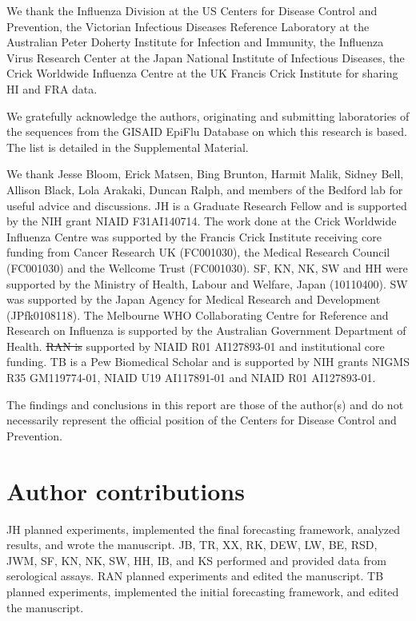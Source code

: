 \documentclass[9pt,lineno]{elife} %
\providecommand{\DIFadd}[1]{{\protect\color{blue}\uwave{#1}}} %
\providecommand{\DIFdel}[1]{{\protect\color{red}\sout{#1}}}                      %
\providecommand{\DIFaddbegin}{} %
\providecommand{\DIFaddend}{} %
\providecommand{\DIFdelbegin}{} %
\providecommand{\DIFdelend}{} %
\providecommand{\DIFaddtex}[1]{{\protect\color{blue}\uwave{#1}}} %
\providecommand{\DIFdeltex}[1]{{\protect\color{red}\sout{#1}}}                      %
\providecommand{\DIFaddbegin}{} %
\providecommand{\DIFaddend}{} %
\providecommand{\DIFdelbegin}{} %
\providecommand{\DIFdelend}{} %
\providecommand{\DIFadd}[1]{\texorpdfstring{\DIFaddtex{#1}}{#1}} %
\providecommand{\DIFdel}[1]{\texorpdfstring{\DIFdeltex{#1}}{}} %
\newcommand{\DIFscaledelfig}{0.5}
\newlength{\DIFdelgraphicswidth} %
\newlength{\DIFdelgraphicsheight} %
\newcommand{\DIFaddincludegraphics}[2][]{{\color{blue}\fbox{\DIFOincludegraphics[#1]{#2}}}} %
\newcommand{\DIFdelincludegraphics}[2][]{%
\sbox{\DIFdelgraphicsbox}{\DIFOincludegraphics[#1]{#2}}%
\settoboxwidth{\DIFdelgraphicswidth}{\DIFdelgraphicsbox} %
\settoboxtotalheight{\DIFdelgraphicsheight}{\DIFdelgraphicsbox} %
\scalebox{\DIFscaledelfig}{%
\parbox[b]{\DIFdelgraphicswidth}{\usebox{\DIFdelgraphicsbox}\\[-\baselineskip] \rule{\DIFdelgraphicswidth}{0em}}\llap{\resizebox{\DIFdelgraphicswidth}{\DIFdelgraphicsheight}{%
\setlength{\unitlength}{\DIFdelgraphicswidth}%
\begin{picture}(1,1)%
\thicklines\linethickness{2pt} %
{\color[rgb]{1,0,0}\put(0,0){\framebox(1,1){}}}%
{\color[rgb]{1,0,0}\put(0,0){\line( 1,1){1}}}%
{\color[rgb]{1,0,0}\put(0,1){\line(1,-1){1}}}%
\end{picture}%
}\hspace*{3pt}}} %
} %
\DeclareRobustCommand{\DIFaddbegin}{\DIFOaddbegin \let\includegraphics\DIFaddincludegraphics} %
\DeclareRobustCommand{\DIFaddend}{\DIFOaddend \let\includegraphics\DIFOincludegraphics} %
\DeclareRobustCommand{\DIFdelbegin}{\DIFOdelbegin \let\includegraphics\DIFdelincludegraphics} %
\DeclareRobustCommand{\DIFdelend}{\DIFOaddend \let\includegraphics\DIFOincludegraphics} %
\begin{document}
We thank the Influenza Division at the US Centers for Disease Control and Prevention, the Victorian Infectious Diseases Reference Laboratory at the Australian Peter Doherty Institute for Infection and Immunity, the Influenza Virus Research Center at the Japan National Institute of Infectious Diseases, the Crick Worldwide Influenza Centre at the UK Francis Crick Institute for sharing HI and FRA data.

We gratefully acknowledge the authors, originating and submitting laboratories of the sequences from the GISAID EpiFlu Database \DIFdelbegin %
\DIFdelend \DIFaddbegin \citep{shu2017gisaid} \DIFaddend on which this research is based. The list is detailed in the Supplemental Material.

We thank Jesse Bloom, Erick Matsen, Bing Brunton, Harmit Malik, Sidney Bell, Allison Black, Lola Arakaki, Duncan Ralph, and members of the Bedford lab for useful advice and discussions.
JH is a Graduate Research Fellow and is supported by the NIH grant NIAID F31AI140714.
The work done at the Crick Worldwide Influenza Centre was supported by the Francis Crick Institute receiving core funding from Cancer Research UK (FC001030), the Medical Research Council (FC001030) and the Wellcome Trust (FC001030).
SF, KN, NK, SW and HH were supported by the Ministry of Health, Labour and Welfare, Japan (10110400).
SW was supported by the Japan Agency for Medical Research and Development (JPfk0108118).
The Melbourne WHO Collaborating Centre for Reference and Research on Influenza is supported by the Australian Government Department of Health.
\DIFdelbegin \DIFdel{RAN is }\DIFdelend \DIFaddbegin \DIFadd{PB and RAN are }\DIFaddend supported by NIAID R01 AI127893-01 and institutional core funding.
TB is a Pew Biomedical Scholar and is supported by NIH grants NIGMS R35 GM119774-01, NIAID U19 AI117891-01 and NIAID R01 AI127893-01.

The findings and conclusions in this report are those of the author(s) and do not necessarily represent the official position of the Centers for Disease Control and Prevention.

\section*{Author contributions}

JH planned experiments, implemented the final forecasting framework, analyzed results, and wrote the manuscript.
JB, TR, XX, RK, DEW, LW, BE, RSD, JWM, SF, KN, NK, SW, HH, IB, and KS performed and provided data from serological assays.
\DIFaddbegin \DIFadd{PB analyzed results.
}\DIFaddend RAN planned experiments and edited the manuscript.
TB planned experiments, implemented the initial forecasting framework, and edited the manuscript.
\end{document}
